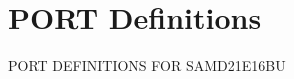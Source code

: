 \hypertarget{group___s_a_m_d21_e16_b_u__port}{}\section{P\+O\+RT Definitions}
\label{group___s_a_m_d21_e16_b_u__port}
P\+O\+RT D\+E\+F\+I\+N\+I\+T\+I\+O\+NS F\+OR S\+A\+M\+D21\+E16\+BU 